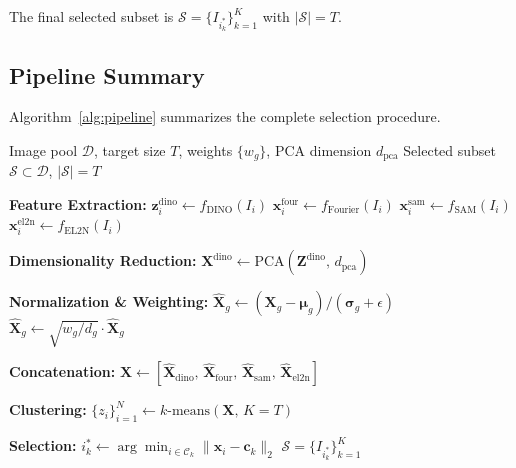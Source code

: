 The final selected subset is $\mathcal{S} = \{I_{i_k^*}\}_{k=1}^{K}$
with $|\mathcal{S}| = T$.

\subsection{Pipeline Summary}
\label{sec:pipeline_summary}

Algorithm~\ref{alg:pipeline} summarizes the complete selection procedure.

\begin{algorithm}[h]
\caption{Multi-Feature Dataset Selection}
\label{alg:pipeline}
\begin{algorithmic}[1]
\Require Image pool $\mathcal{D}$, target size $T$, weights $\{w_g\}$,
         PCA dimension $d_{\text{pca}}$
\Ensure Selected subset $\mathcal{S} \subset \mathcal{D}$, $|\mathcal{S}| = T$

\State \textbf{Feature Extraction:}
    \State $\mathbf{z}_i^{\text{dino}} \gets f_{\text{DINO}}(I_i)$
    \State $\mathbf{x}_i^{\text{four}} \gets f_{\text{Fourier}}(I_i)$
    \State $\mathbf{x}_i^{\text{sam}}  \gets f_{\text{SAM}}(I_i)$
    \State $\mathbf{x}_i^{\text{el2n}} \gets f_{\text{EL2N}}(I_i)$
\EndFor

\State \textbf{Dimensionality Reduction:}
\State $\mathbf{X}^{\text{dino}} \gets \text{PCA}(\mathbf{Z}^{\text{dino}},\, d_{\text{pca}})$

\State \textbf{Normalization \& Weighting:}
    \State $\hat{\mathbf{X}}_g \gets (\mathbf{X}_g - \boldsymbol{\mu}_g) / (\boldsymbol{\sigma}_g + \epsilon)$
    \State $\hat{\mathbf{X}}_g \gets \sqrt{w_g / d_g} \cdot \hat{\mathbf{X}}_g$
\EndFor

\State \textbf{Concatenation:}
\State $\mathbf{X} \gets [\hat{\mathbf{X}}_{\text{dino}},\, \hat{\mathbf{X}}_{\text{four}},\, \hat{\mathbf{X}}_{\text{sam}},\, \hat{\mathbf{X}}_{\text{el2n}}]$

\State \textbf{Clustering:}
\State $\{z_i\}_{i=1}^{N} \gets k\text{-means}(\mathbf{X},\, K{=}T)$

\State \textbf{Selection:}
    \State $i_k^* \gets \arg\min_{i \in \mathcal{C}_k} \|\mathbf{x}_i - \mathbf{c}_k\|_2$
\EndFor
\State \Return $\mathcal{S} = \{I_{i_k^*}\}_{k=1}^{K}$
\end{algorithmic}
\end{algorithm}
